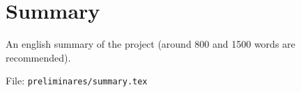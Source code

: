 %

\chapter{Summary}

An english summary of the project (around 800 and 1500 words are recommended).

File: \texttt{preliminares/summary.tex}


\endinput
